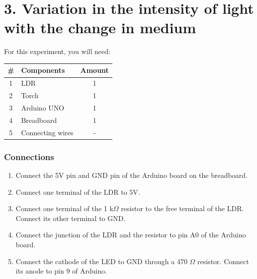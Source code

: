 \section*{3. Variation in the intensity of light with the change in medium}

For this experiment, you will need:
\begin{table}[H]
    \centering
    \begin{tabular}{|c|l|c|}\hline
     \textbf{\#} & \textbf{Components} &  \textbf{Amount}\\\hline
    1 & LDR                 & 1\\\hline
    2 & Torch               & 1\\ \hline
    3 & Arduino UNO       & 1 \\\hline
    4 & Breadboard          & 1 \\\hline
    5 & Connecting wires    & - \\\hline
    \end{tabular}
\end{table}

\subsubsection*{Connections}
\begin{enumerate}[leftmargin=*]
    \item Connect the 5V pin and GND pin of the Arduino board on the breadboard. 
    \item Connect one terminal of the LDR to 5V.
    \item Connect one terminal of the 1 k$\Omega$ resistor to the free terminal of the LDR. Connect its other terminal to GND.
    \item Connect the junction of the LDR and the resistor to pin A$0$ of the Arduino board.
    \item Connect the cathode of the LED to GND through a 470 $\Omega$ resistor. Connect its anode to pin 9 of Arduino.
\end{enumerate}


